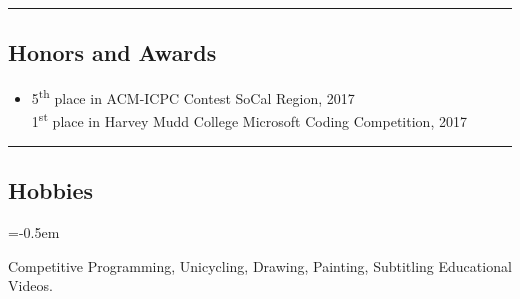 \documentclass[10.5pt,letterpaper]{article}
\begin{document}
\hrule
\vspace{-1.0em}
\subsection*{Honors and Awards}
  \begin{itemize}
    \parskip=-0.5em
    \item[]
    {5\textsuperscript{th} place in ACM-ICPC Contest SoCal Region, 2017}\\
    {1\textsuperscript{st} place in Harvey Mudd College Microsoft Coding Competition, 2017}
  \end{itemize}

\hrule
\vspace{-1.0em}
\subsection*{Hobbies}
\begin{description}[labelindent=\parindent]
  \parskip=-0.5em
\item[] {Competitive Programming, Unicycling, Drawing, Painting, Subtitling Educational Videos.}
\end{description}
\end{document}
